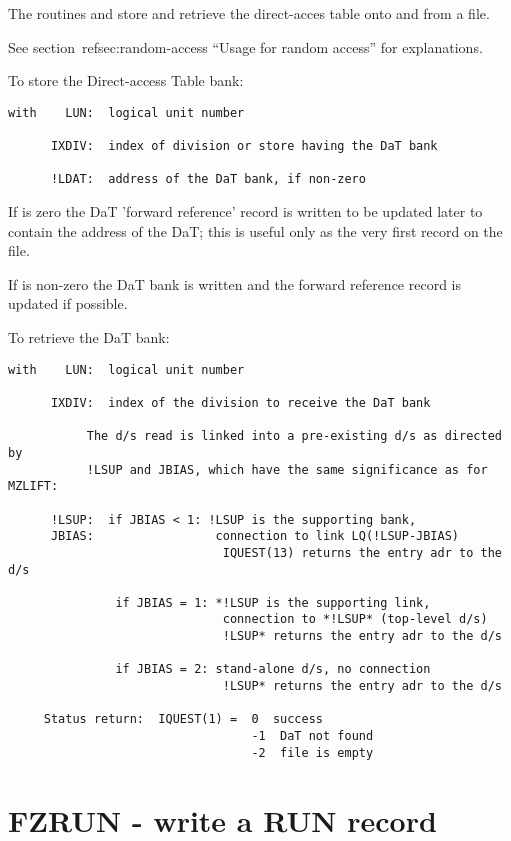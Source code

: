 The routines  and  store and retrieve the direct-acces table
onto and from a file.

See section~ref{sec:random-access} 
``Usage for random access'' for explanations.

To store the Direct-access Table bank:

\begin{verbatim}
with    LUN:  logical unit number

      IXDIV:  index of division or store having the DaT bank

      !LDAT:  address of the DaT bank, if non-zero
\end{verbatim}
If  is zero the DaT 'forward reference' record is written
to be updated later to contain the address of the DaT;
this is useful only as the very first record on the file.

If  is non-zero the DaT bank is written and the forward reference
record is updated if possible.

To retrieve the DaT bank:

\begin{verbatim}
with    LUN:  logical unit number

      IXDIV:  index of the division to receive the DaT bank

           The d/s read is linked into a pre-existing d/s as directed by
           !LSUP and JBIAS, which have the same significance as for MZLIFT:

      !LSUP:  if JBIAS < 1: !LSUP is the supporting bank,
      JBIAS:                 connection to link LQ(!LSUP-JBIAS)
                              IQUEST(13) returns the entry adr to the d/s

               if JBIAS = 1: *!LSUP is the supporting link,
                              connection to *!LSUP* (top-level d/s)
                              !LSUP* returns the entry adr to the d/s

               if JBIAS = 2: stand-alone d/s, no connection
                              !LSUP* returns the entry adr to the d/s

     Status return:  IQUEST(1) =  0  success
                                  -1  DaT not found
                                  -2  file is empty
\end{verbatim}

\section{FZRUN - write a RUN record}

